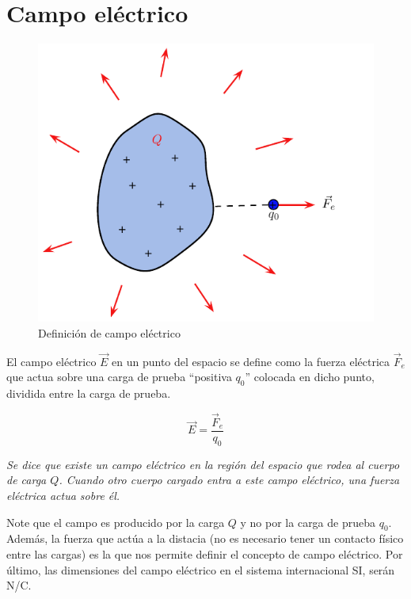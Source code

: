 \section{Campo eléctrico}

\begin{figure}[h]
\begin{center}
\includegraphics[scale=0.6]{electrostatica/campoelectrico1}
\end{center}
\caption{Definición de campo eléctrico}
\label{campoelectrico}
\end{figure}

El campo eléctrico $\vec{E}$ en un punto del espacio se define como la fuerza eléctrica $\vec{F}_e$ que actua sobre una carga de prueba ``positiva $q_0$'' colocada en dicho punto, dividida entre la carga de prueba.

\begin{equation}
\vec{E}=\dfrac{\vec{F}_e}{q_0}
\end{equation}


\textit{Se dice que existe un campo eléctrico en la región del espacio que rodea al cuerpo de carga $Q$. Cuando otro cuerpo cargado entra a este campo eléctrico, una fuerza eléctrica actua sobre él.}

Note que el campo es producido por la carga $Q$ y no por la carga de prueba $q_0$. Además, la fuerza que actúa a la distacia (no es necesario tener un contacto físico entre las cargas) es la que nos permite definir el concepto de campo eléctrico. 
Por último, las dimensiones del campo eléctrico en el sistema internacional SI, serán N/C.

